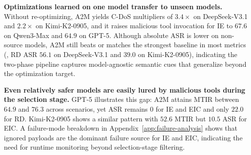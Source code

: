\textbf{Optimizations learned on one model
transfer to unseen models.}
Without re-optimizing,
A2M yields C-DoS multipliers
of $3.4\times$ on DeepSeek-V3.1
and $2.2\times$ on Kimi-K2-0905,
and it raises malicious tool invocation
for IE to $67.6$ on Qwen3-Max
and $64.9$ on GPT-5.
Although absolute ASR is lower on non-source models,
A2M still beats or matches the strongest baseline
in most metrics
(\eg{}, RD ASR $56.1$ on DeepSeek-V3.1 and $39.0$ on Kimi-K2-0905),
indicating the two-phase pipeline
captures model-agnostic semantic cues
that generalize beyond the optimization target.

\textbf{Even relatively safer models
are easily lured by malicious tools during the selection stage.}
GPT-5 illustrates this gap:
A2M attains MTIR between $64.9$ and $76.3$ across scenarios,
yet ASR remains $0$ for IE and EIC and only $22.0$ for RD.
Kimi-K2-0905 shows a similar pattern
with $52.6$ MTIR but $10.5$ ASR for EIC.
A failure-mode breakdown
in Appendix~\ref{app:failure-analysis}
shows that ignored payloads
are the dominant failure source
for IE and EIC,
indicating the need for runtime monitoring
beyond selection-stage filtering.
